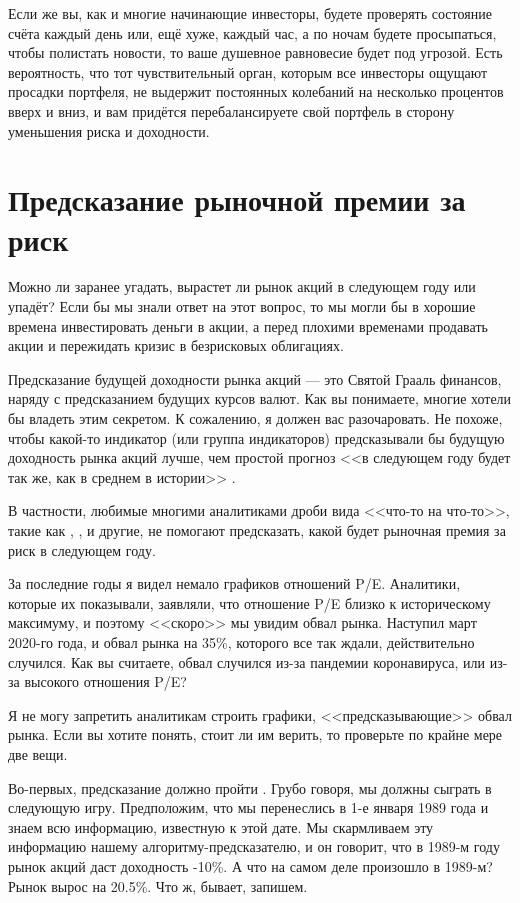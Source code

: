Если же вы, как и многие начинающие инвесторы, будете проверять состояние счёта каждый день или, ещё хуже, каждый час, а по ночам будете просыпаться, чтобы полистать новости, то ваше душевное равновесие будет под угрозой. Есть вероятность, что тот чувствительный орган, которым все инвесторы ощущают просадки портфеля, не выдержит постоянных колебаний на несколько процентов вверх и вниз, и вам придётся перебалансируете свой портфель в сторону уменьшения риска и доходности.

\section{Предсказание рыночной премии за риск}

Можно ли заранее угадать, вырастет ли рынок акций в следующем году или упадёт? Если бы мы знали ответ на этот вопрос, то мы могли бы в хорошие времена инвестировать деньги в акции, а перед плохими временами продавать акции и пережидать кризис в безрисковых облигациях.

Предсказание будущей доходности рынка акций --- это Святой Грааль финансов, наряду с предсказанием будущих курсов валют. Как вы понимаете, многие хотели бы владеть этим секретом. К сожалению, я должен вас разочаровать. Не похоже, чтобы какой-то индикатор (или группа индикаторов) предсказывали бы будущую доходность рынка акций лучше, чем простой прогноз <<в следующем году будет так же, как в среднем в истории>> \cite{welch2008comprehensive}.

В частности, любимые многими аналитиками дроби вида <<что-то на что-то>>, такие как , ,  и другие, не помогают предсказать, какой будет рыночная премия за риск в следующем году. 

За последние годы я видел немало графиков отношений P/E. Аналитики, которые их показывали, заявляли, что отношение P/E близко к историческому максимуму, и поэтому <<скоро>> мы увидим обвал рынка. Наступил март 2020-го года, и обвал рынка на 35\%, которого все так ждали, действительно случился. Как вы считаете, обвал случился из-за пандемии коронавируса, или из-за высокого отношения P/E?

Я не могу запретить аналитикам строить графики, <<предсказывающие>> обвал рынка. Если вы хотите понять, стоит ли им верить, то проверьте по крайне мере две вещи.

Во-первых, предсказание должно пройти  . Грубо говоря, мы должны сыграть в следующую игру. Предположим, что мы перенеслись в 1-е января 1989 года и знаем всю информацию, известную к этой дате. Мы скармливаем эту информацию нашему алгоритму-предсказателю, и он говорит, что в 1989-м году рынок акций даст доходность -10\%. А что на самом деле произошло в 1989-м? Рынок вырос на 20.5\%. Что ж, бывает, запишем.

